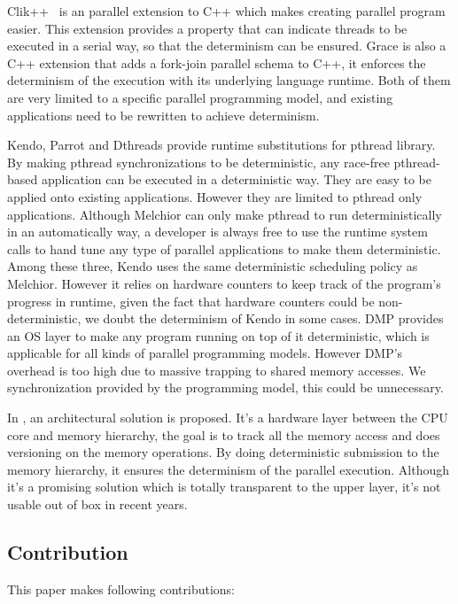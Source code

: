 \documentclass{sig-alternate}
\begin{document}
Clik++~\cite{leiserson2010cilk++} is an parallel extension to C++ which makes creating parallel program easier. This extension provides a property that can indicate threads to be executed in a serial way, so that the determinism can be ensured. Grace \cite{berger2009grace} is also a C++ extension that adds a fork-join parallel schema to C++, it enforces the determinism of the execution with its underlying language runtime. Both of them are very limited to a specific parallel programming model, and existing applications need to be rewritten to achieve determinism.

Kendo\cite{olszewski2009kendo}, Parrot\cite{cui2013parrot} and Dthreads\cite{liu2011dthreads} provide runtime substitutions for pthread library. By making pthread synchronizations to be deterministic, any race-free pthread-based application can be executed in a deterministic way. They are easy to be applied onto existing applications. However they are limited to pthread only applications. Although Melchior can only make pthread to run deterministically in an automatically way, a developer is always free to use the runtime system calls to hand tune any type of parallel applications to make them deterministic. Among these three, Kendo uses the same deterministic scheduling policy as Melchior. However it relies on hardware counters to keep track of the program's progress in runtime, given the fact that hardware counters could be non-deterministic\cite{weaver2008can}, we doubt the determinism  of Kendo in some cases. DMP\cite{devietti2009dmp} provides an OS layer to make any program running on top of it deterministic, which is applicable for all kinds of parallel programming models. However DMP's overhead is too high due to massive trapping to shared memory accesses. We synchronization provided by the programming model, this could be unnecessary.

In \cite{segulja2012architectural}, an architectural solution is proposed. It's a hardware layer between the CPU core and memory hierarchy, the goal is to track all the memory access and does versioning on the memory operations. By doing deterministic submission to the memory hierarchy, it ensures the determinism of the parallel execution. Although it's a promising solution which is totally transparent to the upper layer, it's not usable out of box in recent years. 

\subsection{Contribution}
This paper makes following contributions:
\end{document}
